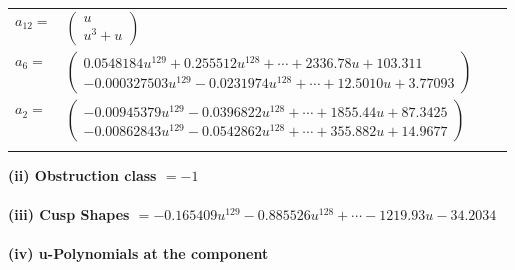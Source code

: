 \documentclass[1p]{elsarticle_modified}
\theoremstyle{definition}
\begin{document}
\begin{tabular}{m{7pt} m{180pt} m{7pt} m{180pt} }
\flushright $a_{12}=$&$\begin{pmatrix}u\\u^3+u\end{pmatrix}$ \\
\flushright $a_{6}=$&$\begin{pmatrix}0.0548184 u^{129}+0.255512 u^{128}+\cdots+2336.78 u+103.311\\-0.000327503 u^{129}-0.0231974 u^{128}+\cdots+12.5010 u+3.77093\end{pmatrix}$ \\
\flushright $a_{2}=$&$\begin{pmatrix}-0.00945379 u^{129}-0.0396822 u^{128}+\cdots+1855.44 u+87.3425\\-0.00862843 u^{129}-0.0542862 u^{128}+\cdots+355.882 u+14.9677\end{pmatrix}$\\&\end{tabular}
\flushleft \textbf{(ii) Obstruction class $= -1$}\\~\\
\flushleft \textbf{(iii) Cusp Shapes $= -0.165409 u^{129}-0.885526 u^{128}+\cdots-1219.93 u-34.2034$}\\~\\
\newpage\renewcommand{\arraystretch}{1}
\flushleft \textbf{(iv) u-Polynomials at the component}\newline \\
\end{document}
